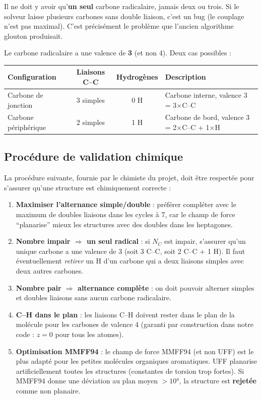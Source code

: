\documentclass[a4paper,12pt]{article}
\begin{document}
\begin{attention}
  Il ne doit y avoir qu'\textbf{un seul} carbone radicalaire, jamais deux ou trois. Si le
  solveur laisse plusieurs carbones sans double liaison, c'est un bug (le couplage n'est pas
  maximal). C'est précisément le problème que l'ancien algorithme glouton produisait.
\end{attention}

Le carbone radicalaire a une valence de \textbf{3} (et non 4). Deux cas possibles :

\begin{center}
\begin{tabular}{lccl}
  \toprule
  Configuration & Liaisons C--C & Hydrogènes & Description \\
  \midrule
  Carbone de jonction  & 3 simples  & 0 H & Carbone interne, valence 3 = 3$\times$C--C \\
  Carbone périphérique & 2 simples  & 1 H & Carbone de bord, valence 3 = 2$\times$C--C + 1$\times$H \\
  \bottomrule
\end{tabular}
\end{center}

\subsection{Procédure de validation chimique}
\label{sec:procedure-chimiste}

La procédure suivante, fournie par le chimiste du projet, doit être respectée pour s'assurer
qu'une structure est chimiquement correcte :

\begin{enumerate}
  \item \textbf{Maximiser l'alternance simple/double} : préférer compléter avec le maximum de
    doubles liaisons dans les cycles à 7, car le champ de force ``planarise'' mieux les
    structures avec des doubles dans les heptagones.
  \item \textbf{Nombre impair $\Rightarrow$ un seul radical} : si $N_C$ est impair, s'assurer
    qu'un unique carbone a une valence de 3 (soit 3 C--C, soit 2 C--C + 1 H). Il faut
    éventuellement \textit{retirer} un H d'un carbone qui a deux liaisons simples avec deux
    autres carbones.
  \item \textbf{Nombre pair $\Rightarrow$ alternance complète} : on doit pouvoir alterner
    simples et doubles liaisons sans aucun carbone radicalaire.
  \item \textbf{C--H dans le plan} : les liaisons C--H doivent rester dans le plan de la
    molécule pour les carbones de valence 4 (garanti par construction dans notre code :
    $z = 0$ pour tous les atomes).
  \item \textbf{Optimisation MMFF94} : le champ de force MMFF94 (et non UFF) est le plus adapté
    pour les petites molécules organiques aromatiques. UFF planarise artificiellement toutes les
    structures (constantes de torsion trop fortes). Si MMFF94 donne une déviation au plan moyen
    $> 10°$, la structure est \textbf{rejetée} comme non planaire.
\end{enumerate}
\end{document}
